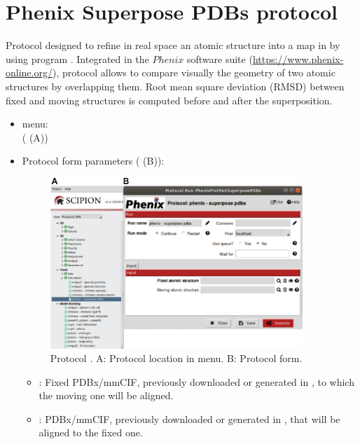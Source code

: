 \section{Phenix Superpose PDBs protocol}
\label{app:superposePdbsProtocol}%
Protocol designed to refine in real space an atomic structure into a map in \scipion by using  program \citep{zwartUrl}. Integrated in the $Phenix$ software suite (\url{https://www.phenix-online.org/}), \phenix protocol  allows to compare visually the geometry of two atomic structures by overlapping them. Root mean square deviation (RMSD) between fixed and moving structures is computed before and after the superposition. 

\begin{itemize}
 \item \scipion menu:\\
   ( (A))\\
  
 \item Protocol form parameters ( (B)):\\
 
 \begin{figure}[H]
     \centering 
     \captionsetup{width=.7\linewidth} 
     \includegraphics[width=0.90\textwidth]{Images_appendix/Fig153.pdf}
     \caption{Protocol . A: Protocol location in \scipion menu. B: Protocol form.}
     \label{fig:app_protocol_superpose_pdbs_1}
    \end{figure}
    
   \begin{itemize}
    \item {}: Fixed PDBx/mmCIF, previously downloaded or generated in \scipion, to which the moving one will be aligned. 
    \item {}: PDBx/mmCIF, previously downloaded or generated in \scipion, that will be aligned to the fixed one.
   \end{itemize}
 

\end{itemize}

